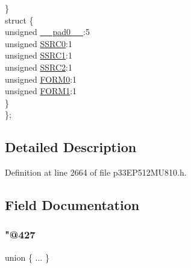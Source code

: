 \begin{DoxyCompactItemize}
\begin{tabbing}
\>\} \\
\>struct \{\\
\>\>unsigned \hyperlink{structtag_a_d2_c_o_n1_b_i_t_s_adf71f3d8410c1f1dbbc96680a92c49af}{\_\_pad0\_\_}:5\\
\>\>unsigned \hyperlink{structtag_a_d2_c_o_n1_b_i_t_s_acd7795c57edda66fa10332aa8b6b162e}{SSRC0}:1\\
\>\>unsigned \hyperlink{structtag_a_d2_c_o_n1_b_i_t_s_aefc0488a9751bcca8f6363a20530a1cf}{SSRC1}:1\\
\>\>unsigned \hyperlink{structtag_a_d2_c_o_n1_b_i_t_s_a95ec48e12cb5dc231b4951f71d394eac}{SSRC2}:1\\
\>\>unsigned \hyperlink{structtag_a_d2_c_o_n1_b_i_t_s_aed90db8350c817f0054f588f1cdfe042}{FORM0}:1\\
\>\>unsigned \hyperlink{structtag_a_d2_c_o_n1_b_i_t_s_ae89d5eddf961b33b93d2c9d49b8e7d1a}{FORM1}:1\\
\>\} \\
\}; \\

\end{tabbing}\end{DoxyCompactItemize}


\subsection{Detailed Description}


Definition at line 2664 of file p33\+E\+P512\+M\+U810.\+h.



\subsection{Field Documentation}
\mbox{\label{structtag_a_d2_c_o_n1_b_i_t_s_ae31a124ccfb44ecc7bb43908d0de7389}} 
\subsubsection{\texorpdfstring{"@427}{@427}}
{\footnotesize\ttfamily union \{ ... \} }

\mbox{\label{structtag_a_d2_c_o_n1_b_i_t_s_adf71f3d8410c1f1dbbc96680a92c49af}} 
